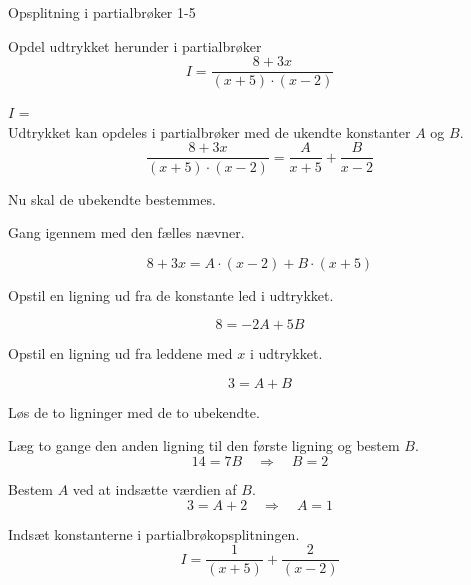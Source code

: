 \documentclass{article}
\begin{document}
\begin{exercise}{Opsplitning i partialbrøker 1-5}
	
	Opdel udtrykket herunder i partialbrøker
	\[
	I = \frac{8 + 3x}{(x + 5) \cdot (x - 2)}
	\]
	
	$I$ =  \\
	
	\hint
	Udtrykket kan opdeles i partialbrøker med de ukendte konstanter $A$ og $B$.
	\[
	\frac{8 + 3x}{(x + 5) \cdot (x - 2)} = 
	\frac{A}{x + 5} + \frac{B}{x - 2}
	\]
	
	\hint
	Nu skal de ubekendte bestemmes.
	
	\hint
	Gang igennem med den fælles nævner.
	
	\hint
	\[
	8 + 3x = A \cdot (x - 2) + B \cdot (x + 5)
	\]
	
	\hint
	Opstil en ligning ud fra de konstante led i udtrykket.
	
	\hint
	\[
	8 = -2A + 5B
	\]
	
	\hint
	Opstil en ligning ud fra leddene med $x$ i udtrykket.
	
	\hint
	\[
	3 = A + B
	\]
	
	\hint
	Løs de to ligninger med de to ubekendte.
	
	\hint
	Læg to gange den anden ligning til den første ligning og bestem $B$.
	\[
	14 = 7B \quad	\Rightarrow		\quad		B = 2
	\]
	
	\hint
	Bestem $A$ ved at indsætte værdien af $B$.
	\[
	3 =  A + 2 \quad 	\Rightarrow		\quad A = 1
	\]
	
	\hint
	Indsæt konstanterne i partialbrøkopsplitningen.
	\[
	I = \frac{1}{(x+5)} + \frac{2}{(x-2)}
	\]
	
	
	
\end{exercise}
\end{document}
